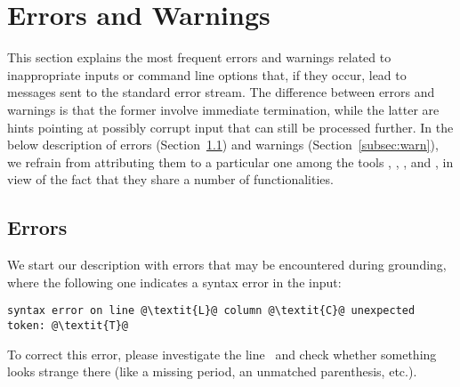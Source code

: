 \section{Errors and Warnings}\label{sec:error:warn}

This section explains the most frequent errors and warnings
related to inappropriate inputs or command line options that,
if they occur, lead to messages sent to the standard error stream.
The difference between errors and warnings is that the former
involve immediate termination,
while the latter are hints pointing at possibly corrupt input
that can still be processed further.
In the below description of errors (Section~\ref{subsec:error})
and warnings (Section~\ref{subsec:warn}),
we refrain from attributing them to a particular one among the tools
\gringo, \clasp, \clingo, and \iclingo,
in view of the fact that they share a number of functionalities.


\subsection{Errors}\label{subsec:error}

We start our description with errors that may be encountered during grounding,
where the following one indicates a syntax error in the input:
%
\begin{lstlisting}[numbers=none,escapechar=@]
syntax error on line @\textit{L}@ column @\textit{C}@ unexpected token: @\textit{T}@
\end{lstlisting}
%
To correct this error, please investigate the line~
and check whether something looks strange there
(like a missing period, an unmatched parenthesis, etc.).

